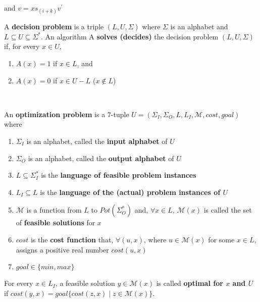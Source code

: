\begin{tabu}
  and $v = xs_{(i+k)}v^\prime$ \\ \hline
 {A {\bf decision problem} is a triple $(L, U, \Sigma)$ where $\Sigma$ is an
   alphabet and $L \subseteq U \subseteq \Sigma^*$. An algorithm A {\bf solves
     (decides)} the decision problem $(L, U, \Sigma)$ if, for every $x \in U$,
  \begin{enumerate} \itemsep1pt \parskip0pt  \vspace{-\medskipamount}
  \item $A(x) = 1$ if $x \in L$, and
  \item $A(x) = 0$ if $x \in U - L$ ($x \notin L$)
  \vspace{-\medskipamount} \end{enumerate}
  } \\ \hline
 {An {\bf optimization problem} is a 7-tuple $U = (\Sigma_I, \Sigma_O, L, L_I,
   \mathcal{M}, cost, goal)$ where
   \begin{enumerate} \itemsep1pt \parskip0pt  \vspace{-\medskipamount}
   \item $\Sigma_I$ is an alphabet, called the {\bf input alphabet} of $U$
   \item $\Sigma_O$ is an alphabet, called the {\bf output alphabet} of $U$
   \item $L \subseteq \Sigma_I^*$ is the {\bf language of feasible problem
     instances}
   \item $L_I \subseteq L$ is the {\bf language of the (actual) problem
     instances of $U$}
   \item $\mathcal{M}$ is a function from $L$ to $Pot(\Sigma_O^*)$ and, $\forall
     x \in L$, $\mathcal{M}(x)$ is called the set of {\bf feasible solutions}
     for $x$
   \item $cost$ is the {\bf cost function} that, $\forall (u, x)$, where
     $u \in \mathcal{M}(x)$ for some $x \in L$, assigns a positive real number
     $cost(u, x)$
   \item $goal \in \{min, max\}$
   \vspace{-\medskipamount} \end{enumerate}
   For every $x \in L_I$, a feasible solution $y \in \mathcal{M}(x)$ is called
   {\bf optimal for $x$ and $U$} if $cost(y, x) = goal\{cost(z,x) \mid z \in
   \mathcal{M}(x)\}$. \newline
}
\end{tabu}

